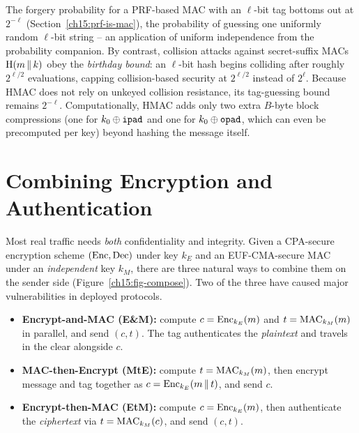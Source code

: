\begin{connectionbox}
The forgery probability for a PRF-based MAC with an $\ell$-bit tag bottoms out at $2^{-\ell}$ (Section~\ref{ch15:prf-is-mac}), the probability of guessing one uniformly random $\ell$-bit string -- an application of uniform independence from the probability companion. By contrast, collision attacks against secret-suffix MACs $\operatorname{H}(m \,\|\, k)$ obey the \emph{birthday bound}: an $\ell$-bit hash begins colliding after roughly $2^{\ell/2}$ evaluations, capping collision-based security at $2^{\ell/2}$ instead of $2^{\ell}$. Because HMAC does not rely on unkeyed collision resistance, its tag-guessing bound remains $2^{-\ell}$. Computationally, HMAC adds only two extra $B$-byte block compressions (one for $k_0 \oplus \texttt{ipad}$ and one for $k_0 \oplus \texttt{opad}$, which can even be precomputed per key) beyond hashing the message itself.
\end{connectionbox}

\section{Combining Encryption and Authentication}
\label{ch15:combining}

Most real traffic needs \emph{both} confidentiality and integrity. Given a CPA-secure encryption scheme $(\operatorname{Enc}, \operatorname{Dec})$ under key $k_E$ and an EUF-CMA-secure MAC under an \emph{independent} key $k_M$, there are three natural ways to combine them on the sender side (Figure~\ref{ch15:fig-compose}). Two of the three have caused major vulnerabilities in deployed protocols.

\begin{itemize}
  \item \textbf{Encrypt-and-MAC (E\&M):} compute $c = \operatorname{Enc}_{k_E}(m)$ and $t = \operatorname{MAC}_{k_M}(m)$ in parallel, and send $(c,t)$. The tag authenticates the \emph{plaintext} and travels in the clear alongside $c$.
  \item \textbf{MAC-then-Encrypt (MtE):} compute $t = \operatorname{MAC}_{k_M}(m)$, then encrypt message and tag together as $c = \operatorname{Enc}_{k_E}(m\,\|\, t)$, and send $c$.
  \item \textbf{Encrypt-then-MAC (EtM):} compute $c = \operatorname{Enc}_{k_E}(m)$, then authenticate the \emph{ciphertext} via $t = \operatorname{MAC}_{k_M}(c)$, and send $(c,t)$.
\end{itemize}

